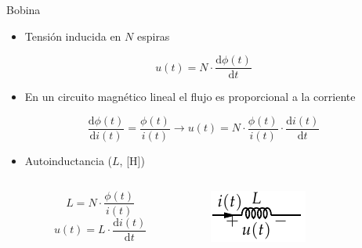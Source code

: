 \documentclass[xcolor={usenames,svgnames,dvipsnames}]{beamer}
\begin{document}
\begin{frame}[label={sec:org1ca188b}]{Bobina}
\begin{itemize}
\item Tensión inducida en \(N\) espiras
\end{itemize}
\[
u(t) = N \cdot \frac{\mathrm{d}\phi(t)}{\mathrm{d} t}
\]
\begin{itemize}
\item En un circuito magnético lineal el flujo es proporcional a la corriente
\end{itemize}
\[
  \frac{\mathrm{d}\phi(t)}{\mathrm{d} i(t)} = \frac{\phi(t)}{i(t)}
\rightarrow
u(t) = N \cdot \frac{\phi(t)}{i(t)} \cdot \frac{\mathrm{d}i(t)}{\mathrm{d} t}
\]

\begin{itemize}
\item Autoinductancia (\(L\), [H])
\end{itemize}
\begin{columns}
\begin{column}{0.5\columnwidth}
\[
  \boxed{L = N \cdot \frac{\phi(t)}{i(t)}}
\]
\[
  \boxed{u(t) = L \cdot \frac{\mathrm{d}i(t)}{\mathrm{d} t}}
\]
\end{column}
\begin{column}{0.5\columnwidth}
\begin{center}
\includegraphics[height=0.2\textheight]{../figs/Bobina.pdf}
\end{center}
\end{column}
\end{columns}
\end{frame}
\end{document}
